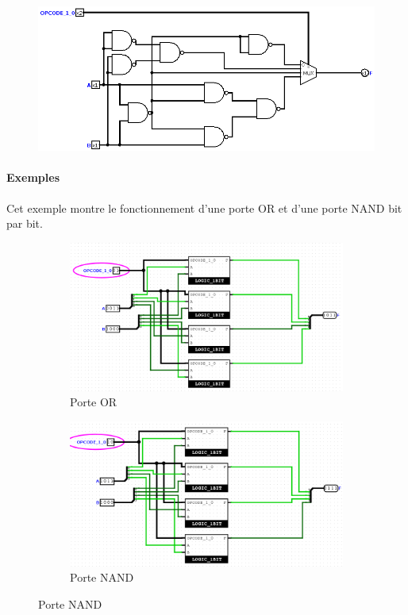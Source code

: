 \documentclass[a4paper]{article}
\begin{document}
\begin{tcolorbox}[colframe=Monokaimagenta,colback=white]
\begin{figure}[H]
    \centering
    \includegraphics[width=.5\textwidth]{src/LOGIC_1BIT.png}
    \label{fig:LOGIQUE_1BIT}
\end{figure}


\paragraph{Exemples}
Cet exemple montre le fonctionnement d'une porte OR et d'une porte NAND bit par bit.
\begin{figure}[H]	
	\centering
	\begin{subfigure}[t]{1in}
		\centering
		\includegraphics[width=1\textwidth]{src/LOGIC_4BITS_TEST_OR.png}
		\caption{Porte OR}
		\label{fig:LOGIQUE_4BITS_OR}
	\end{subfigure}
	\quad
	\begin{subfigure}[t]{1in}
		\centering
		\includegraphics[width=1\textwidth]{src/LOGIC_4BITS_TEST_NAND.png}
		\caption{Porte NAND}
		\label{fig:LOGIQUE_4BITS_OR}
	\end{subfigure}
\end{figure}

\end{tcolorbox}
\end{document}
